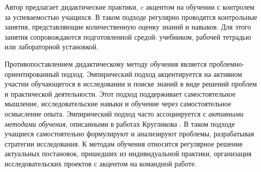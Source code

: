 Автор предлагает дидактические практики, c акцентом на обучении с контролем за успеваемостью учащихся.
В таком подходе  регулярно проводятся контрольные занятия, представляющие количественную оценку знаний и навыков.
Для этого занятия сопровождаются подготовленной средой: учебником, рабочей тетрадью или лабораторной установкой.

Противопоставлением дидактическому методу обучения является проблемно-ориентированный подход.
Эмпирический подход акцентируется на активном участии обучающегося в исследовании и поиске знаний в виде решений проблем и практической деятельности.
Этот подход поддерживает самостоятельное мышление, исследовательские навыки и обучение через самостоятельное осмысление опыта.
Эмпирический подход часто ассоциируется с \textit{активными методами обучения}, описанными в работах Кругликова \cite{кругликов2006деловые}.
В таком подходе учащиеся самостоятельно формулируют и анализируют проблемы, разрабатывая стратегии исследования.
К методам обучения относится регулярное решение актуальных постановок, пришедших из индивидуальной практики, организация исследовательских проектов с
акцентом на командной работе.

